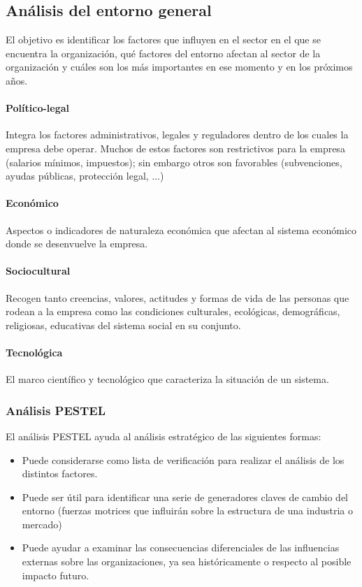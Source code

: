 \documentclass[12pt]{article}
\theoremstyle{definition_wo_parentheses}
\begin{document}
\subsection{Análisis del entorno general}

El objetivo es identificar los factores que influyen en el sector en el que se encuentra la organización, qué factores del entorno afectan al sector de la organización y cuáles son los más importantes en ese momento y en los próximos años.

\paragraph{Político-legal} Integra los factores administrativos, legales y reguladores dentro de los cuales la empresa debe operar. Muchos de estos factores son restrictivos para la empresa (salarios mínimos, impuestos); sin embargo otros son favorables (subvenciones, ayudas públicas, protección legal, ...)

\paragraph{Económico} Aspectos o indicadores de naturaleza económica que afectan al sistema económico donde se desenvuelve la empresa.

\paragraph{Sociocultural} Recogen tanto creencias, valores, actitudes y formas de vida de las personas que rodean a la empresa como las condiciones culturales, ecológicas, demográficas, religiosas, educativas del sistema social en su conjunto.

\paragraph{Tecnológica} El marco científico y tecnológico que caracteriza la situación de un sistema.

\subsubsection{Análisis PESTEL}

El análisis PESTEL ayuda al análisis estratégico de las siguientes formas:

\begin{itemize}
\item Puede considerarse como lista de verificación para realizar el análisis de los distintos factores.
\item Puede ser útil para identificar una serie de generadores claves de cambio del entorno (fuerzas motrices que influirán sobre la estructura de una industria o mercado)
\item Puede ayudar a examinar las consecuencias diferenciales de las influencias externas sobre las organizaciones, ya sea históricamente o respecto al posible impacto futuro.
\end{itemize}
\end{document}
